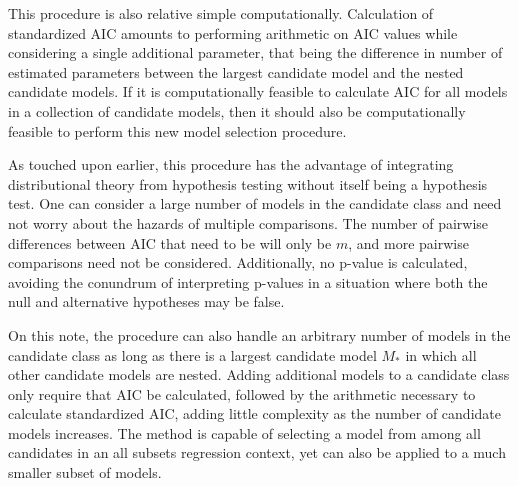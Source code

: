 		This procedure is also relative simple computationally. Calculation of standardized AIC amounts to performing arithmetic on AIC values while considering
		a single additional parameter, that being the difference in number of estimated parameters between the largest candidate model and the nested candidate 
		models. If it is computationally feasible to calculate AIC for all models in a collection of candidate models, then it should also be computationally
		feasible to perform this new model selection procedure.
		
		As touched upon earlier, this procedure has the advantage of integrating distributional theory from hypothesis testing without itself being a hypothesis test.
		One can consider a large number of models in the candidate class and need not worry about the hazards of multiple comparisons. The number of pairwise differences
		between AIC that need to be will only be $m$, and more pairwise comparisons need not be considered. Additionally, no p-value
		is calculated, avoiding the conundrum of interpreting p-values in a situation where both the null and alternative hypotheses may be false.

		On this note, the procedure can also handle an arbitrary number of models in the candidate class as long as there is a largest candidate model $M_*$ in which all
		other candidate models are nested. Adding additional models to a candidate class only require that AIC be calculated, followed by the arithmetic necessary to
		calculate standardized AIC, adding little complexity as the number of candidate models increases. The method is capable of selecting a model from among all
		candidates in an all subsets regression context, yet can also be applied to a much smaller subset of models.

